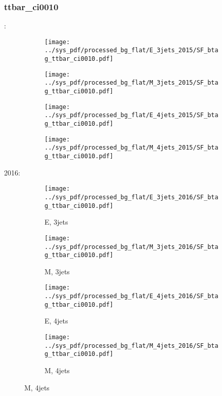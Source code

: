 \documentclass{beamer}
\begin{document}
\begin{frame}
\frametitle{ttbar_ci0010}
\fontsize{5}{1}:
\begin{figure}
\centering
\begin{subfigure}[b]{0.24\textwidth}
\texttt{[image: ../sys\_pdf/processed\_bg\_flat/E\_3jets\_2015/SF\_btag\_ttbar\_ci0010.pdf]}
\end{subfigure}
\begin{subfigure}[b]{0.24\textwidth}
\texttt{[image: ../sys\_pdf/processed\_bg\_flat/M\_3jets\_2015/SF\_btag\_ttbar\_ci0010.pdf]}
\end{subfigure}
\begin{subfigure}[b]{0.24\textwidth}
\texttt{[image: ../sys\_pdf/processed\_bg\_flat/E\_4jets\_2015/SF\_btag\_ttbar\_ci0010.pdf]}
\end{subfigure}
\begin{subfigure}[b]{0.24\textwidth}
\texttt{[image: ../sys\_pdf/processed\_bg\_flat/M\_4jets\_2015/SF\_btag\_ttbar\_ci0010.pdf]}
\end{subfigure}
\end{figure}
2016:
\begin{figure}
\centering
\begin{subfigure}[b]{0.24\textwidth}
\texttt{[image: ../sys\_pdf/processed\_bg\_flat/E\_3jets\_2016/SF\_btag\_ttbar\_ci0010.pdf]}
\captionsetup{font=tiny}
\caption{E, 3jets}
\end{subfigure}
\begin{subfigure}[b]{0.24\textwidth}
\texttt{[image: ../sys\_pdf/processed\_bg\_flat/M\_3jets\_2016/SF\_btag\_ttbar\_ci0010.pdf]}
\captionsetup{font=tiny}
\caption{M, 3jets}
\end{subfigure}
\begin{subfigure}[b]{0.24\textwidth}
\texttt{[image: ../sys\_pdf/processed\_bg\_flat/E\_4jets\_2016/SF\_btag\_ttbar\_ci0010.pdf]}
\captionsetup{font=tiny}
\caption{E, 4jets}
\end{subfigure}
\begin{subfigure}[b]{0.24\textwidth}
\texttt{[image: ../sys\_pdf/processed\_bg\_flat/M\_4jets\_2016/SF\_btag\_ttbar\_ci0010.pdf]}
\captionsetup{font=tiny}
\caption{M, 4jets}
\end{subfigure}
\end{figure}
\end{frame}
\end{document}
